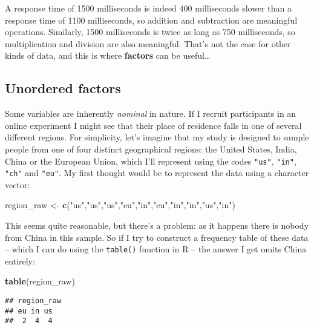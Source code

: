 \documentclass[]{book}
\newenvironment{Shaded}{\begin{snugshade}}{\end{snugshade}}
\newcommand{\KeywordTok}[1]{\textcolor[rgb]{0.13,0.29,0.53}{\textbf{#1}}}
\newcommand{\NormalTok}[1]{#1}
\newcommand{\StringTok}[1]{\textcolor[rgb]{0.31,0.60,0.02}{#1}}
\begin{document}
A response time of 1500 milliseconds is indeed 400 milliseconds slower than a response time of 1100 milliseconds, so addition and subtraction are meaningful operations. Similarly, 1500 milliseconds is twice as long as 750 milliseconds, so multiplication and division are also meaningful. That's not the case for other kinds of data, and this is where \textbf{factors} can be useful\ldots{}

\hypertarget{unordered-factors}{%
\subsection{Unordered factors}\label{unordered-factors}}

Some variables are inherently \emph{nominal} in nature. If I recruit participants in an online experiment I might see that their place of residence falls in one of several different regions. For simplicity, let's imagine that my study is designed to sample people from one of four distinct geographical regions: the United States, India, China or the European Union, which I'll represent using the codes \texttt{"us"}, \texttt{"in"}, \texttt{"ch"} and \texttt{"eu"}. My first thought would be to represent the data using a character vector:

\begin{Shaded}
\begin{Highlighting}[]
\NormalTok{region_raw <-}\StringTok{ }\KeywordTok{c}\NormalTok{(}\StringTok{"us"}\NormalTok{,}\StringTok{"us"}\NormalTok{,}\StringTok{"us"}\NormalTok{,}\StringTok{"eu"}\NormalTok{,}\StringTok{"in"}\NormalTok{,}\StringTok{"eu"}\NormalTok{,}\StringTok{"in"}\NormalTok{,}\StringTok{"in"}\NormalTok{,}\StringTok{"us"}\NormalTok{,}\StringTok{"in"}\NormalTok{)}
\end{Highlighting}
\end{Shaded}

This seems quite reasonable, but there's a problem: as it happens there is nobody from China in this sample. So if I try to construct a frequency table of these data -- which I can do using the \texttt{table()} function in R -- the answer I get omits China entirely:

\begin{Shaded}
\begin{Highlighting}[]
\KeywordTok{table}\NormalTok{(region_raw)}
\end{Highlighting}
\end{Shaded}

\begin{verbatim}
## region_raw
## eu in us 
##  2  4  4
\end{verbatim}
\end{document}
